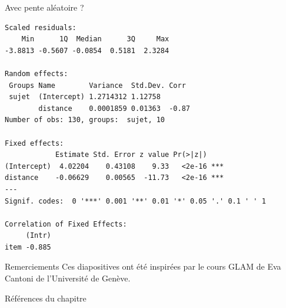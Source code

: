 \documentclass{BeamerTemplate}
\begin{document}
\begin{refsection}
\begin{frame}[fragile]{Avec pente aléatoire ?}
{\begin{verbatim}
Scaled residuals: 
    Min      1Q  Median      3Q     Max 
-3.8813 -0.5607 -0.0854  0.5181  2.3284 

Random effects:
 Groups Name        Variance  Std.Dev. Corr 
 sujet  (Intercept) 1.2714312 1.12758       
        distance    0.0001859 0.01363  -0.87
Number of obs: 130, groups:  sujet, 10

Fixed effects:
            Estimate Std. Error z value Pr(>|z|)    
(Intercept)  4.02204    0.43108    9.33   <2e-16 ***
distance    -0.06629    0.00565  -11.73   <2e-16 ***
---
Signif. codes:  0 '***' 0.001 '**' 0.01 '*' 0.05 '.' 0.1 ' ' 1

Correlation of Fixed Effects:
     (Intr)
item -0.885
\end{verbatim}
}
\end{frame}

\begin{frame}{Remerciements}
Ces diapositives ont été inspirées par le cours GLAM de Eva Cantoni de l'Université de Genève.
\end{frame}

\begin{frame}[allowframebreaks]{Références du chapitre}
\tiny
\printbibliography[heading=none,section=\therefsection]
\end{frame}

\end{refsection}
\end{document}
